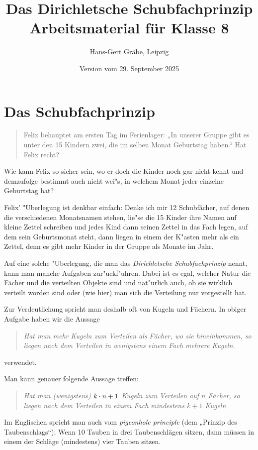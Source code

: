 \documentclass[11pt]{article}
\author{Hans-Gert Gräbe, Leipzig}
\title{Das Dirichletsche Schubfachprinzip\kosemnetlicensemark\\ 
Arbeitsmaterial für Klasse 8}
\date{Version vom 29. September 2025}
\begin{document}
 
\maketitle 

\section{Das Schubfachprinzip}
\begin{quote}
Felix behauptet am ersten Tag im Ferienlager: „In unserer Gruppe gibt es unter
den 15 Kindern zwei, die im selben Monat Geburtstag haben.“ Hat Felix recht?
\end{quote}
Wie kann Felix so sicher sein, wo er doch die Kinder noch gar nicht kennt und
demzufolge bestimmt auch nicht wei"s, in welchem Monat jeder einzelne
Geburtstag hat?

Felix' "Uberlegung ist denkbar einfach: Denke ich mir 12 Schubfächer, auf
denen die verschiedenen Monatsnamen stehen, lie"se die 15 Kinder ihre Namen
auf kleine Zettel schreiben und jedes Kind dann seinen Zettel in das Fach
legen, auf dem sein Geburtsmonat steht, dann liegen in einem der K"asten mehr
als ein Zettel, denn es gibt mehr Kinder in der Gruppe als Monate im Jahr.

Auf eine solche "Uberlegung, die man das \emph{Dirichletsche Schubfachprinzip}
nennt, kann man manche Aufgaben zur"uckf"uhren. Dabei ist es egal, welcher
Natur die Fächer und die verteilten Objekte sind und nat"urlich auch, ob sie
wirklich verteilt worden sind oder (wie hier) man sich die Verteilung nur
vorgestellt hat.

Zur Verdeutlichung spricht man deshalb oft von Kugeln und Fächern. In obiger
Aufgabe haben wir die Aussage
\begin{quote}\it
Hat man mehr Kugeln zum Verteilen als Fächer, wo sie hineinkommen, so liegen
nach dem Verteilen in wenigstens einem Fach mehrere Kugeln.
\end{quote}
verwendet.

Man kann genauer folgende Aussage treffen:
\begin{quote} \it
Hat man (wenigstens) $k\cdot n+1$ Kugeln zum Verteilen auf $n$ Fächer, so liegen
nach dem Verteilen in einem Fach mindestens $k+1$ Kugeln.
\end{quote}

Im Englischen spricht man auch vom \emph{pigeonhole principle} (dem „Prinzip
des Taubenschlags“); Wenn 10 Tauben in drei Taubenschlägen sitzen, dann müssen
in einem der Schläge (mindestens) vier Tauben sitzen.
\end{document}
